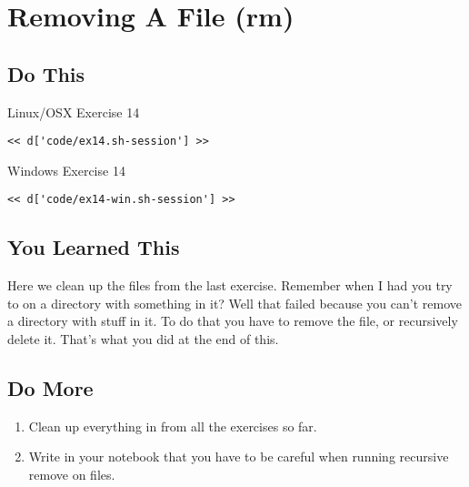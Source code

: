 \chapter{Removing A File (rm)}

\section{Do This}

\begin{code}{Linux/OSX Exercise 14}
\begin{Verbatim}
<< d['code/ex14.sh-session'] >>
\end{Verbatim}
\end{code}

\begin{code}{Windows Exercise 14}
\begin{Verbatim}
<< d['code/ex14-win.sh-session'] >>
\end{Verbatim}
\end{code}

\section{You Learned This}

Here we clean up the files from the last exercise.  Remember when I had you
try to  on a directory with something in it?  Well that failed
because you can't remove a directory with stuff in it.  To do that you have
to remove the file, or recursively delete it.  That's what you did at the
end of this.

\section{Do More}

\begin{enumerate}
\item Clean up everything in  from all the exercises so far.
\item Write in your notebook that you have to be careful when running recursive
    remove on files.
\end{enumerate}

